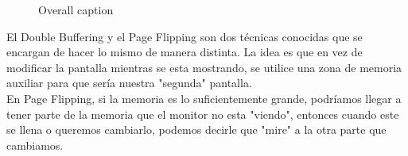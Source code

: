 \documentclass[]{article}
\begin{document}
\begin{figure}[!htb]
	\centering
	\caption{\label{ref_label_overall}Overall caption}
\end{figure}


El Double Buffering y el Page Flipping son dos t\'ecnicas conocidas que se encargan de hacer lo mismo de manera distinta. La idea es que en vez de modificar la pantalla mientras se esta mostrando, se utilice una zona de memoria auxiliar para que ser\'ia nuestra "segunda" pantalla.\\

En Page Flipping, si la memoria es lo suficientemente grande, podr\'iamos llegar a tener parte de la memoria que el monitor no esta "viendo", entonces cuando este se llena o queremos cambiarlo, podemos decirle que "mire" a la otra parte que cambiamos.\\
\end{document}
